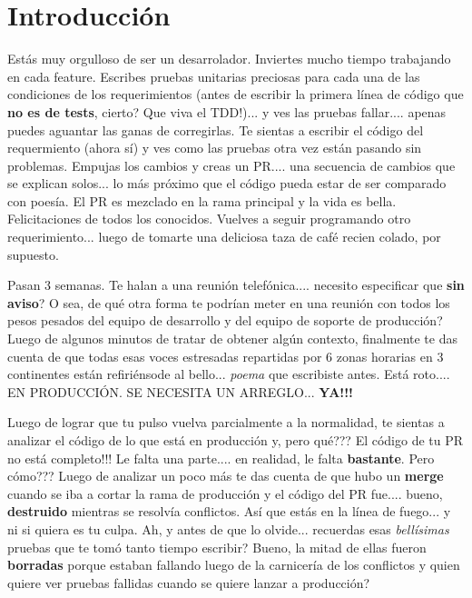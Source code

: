 
\section{Introducción}

Estás muy orgulloso de ser un desarrolador. Inviertes mucho tiempo trabajando en cada feature. Escribes
pruebas unitarias preciosas para cada una de las condiciones de los requerimientos (antes de escribir
la primera línea de código que {\bf no es de tests}, cierto? Que viva el TDD!)... y ves las pruebas fallar....
apenas puedes aguantar las ganas de corregirlas. Te sientas a escribir el código del requermiento (ahora sí)
y ves como las pruebas otra vez están pasando sin problemas. Empujas los cambios y creas un PR.... una secuencia
de cambios que se explican solos... lo más próximo que el código pueda estar de ser comparado con poesía. El PR
es mezclado en la rama principal y la vida es bella. Felicitaciones de todos los conocidos. Vuelves a seguir
programando otro requerimiento... luego de tomarte una deliciosa taza de café recien colado, por supuesto.

Pasan 3 semanas. Te halan a una reunión telefónica.... necesito especificar que {\bf sin aviso}? O sea, de qué otra forma
te podrían meter en una reunión con todos los pesos pesados del equipo de desarrollo y del equipo de soporte de producción?
Luego de algunos minutos de tratar de obtener algún contexto, finalmente te das cuenta de que todas esas voces estresadas
 repartidas por 6 zonas horarias en 3 continentes están refiriénsode al bello... {\it poema} que escribiste antes.
 Está roto.... EN PRODUCCIÓN. SE NECESITA UN ARREGLO... {\bf YA!!!}

Luego de lograr que tu pulso vuelva parcialmente a la normalidad, te sientas a analizar el código de lo que está en
producción y, pero qué??? El código de tu PR no está completo!!! Le falta una parte.... en realidad, le falta {\bf bastante}.
Pero cómo??? Luego de analizar un poco más te das cuenta de que hubo un {\bf merge} cuando se iba a cortar la rama
de producción y el código del PR fue.... bueno, {\bf destruido} mientras se resolvía conflictos. Así que estás
en la línea de fuego... y ni si quiera es tu culpa. Ah, y antes de que lo olvide... recuerdas esas {\it bellísimas}
pruebas que te tomó tanto tiempo escribir? Bueno, la mitad de ellas fueron {\bf borradas} porque estaban fallando luego
de la carnicería de los conflictos y quien quiere ver pruebas fallidas cuando se quiere lanzar a producción?

